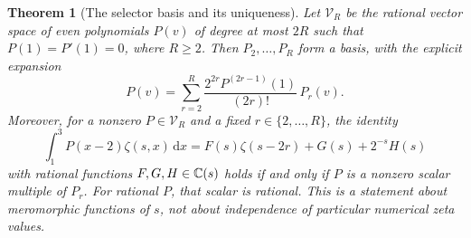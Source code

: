 \documentclass[11pt,letterpaper]{article}
\numberwithin{equation}{section}
\newtheorem{theorem}{Theorem}[section]
\theoremstyle{definition}\newtheorem{definition}[theorem]{Definition}
\theoremstyle{remark}\newtheorem{remark}[theorem]{Remark}
\newcommand{\dd}{\,\mathrm d}\newcommand{\ii}{\mathrm i}
\begin{document}
\begin{theorem}[The selector basis and its uniqueness]
\label{ag:thm:selector-classification}
Let $\mathscr V_R$ be the rational vector space of even polynomials
$P(v)$ of degree at most $2R$ such that $P(1)=P'(1)=0$, where $R\ge2$.
Then $P_2,\ldots,P_R$ form a basis, with the explicit expansion
\begin{equation}\label{ag:eq:selector-expansion}
 \boxed{
 P(v)=\sum_{r=2}^R\frac{2^{2r}P^{(2r-1)}(1)}{(2r)!}\,P_r(v).}
\end{equation}
Moreover, for a nonzero $P\in\mathscr V_R$ and a fixed $r\in\{2,\ldots,R\}$,
the identity
\begin{equation}\label{ag:eq:selector-class}
 \int_1^3P(x-2)\zeta(s,x)\dd x
 =F(s)\zeta(s-2r)+G(s)+2^{-s}H(s)
\end{equation}
with rational functions $F,G,H\in\mathbb C(s)$ holds if and only if $P$ is a
nonzero scalar multiple of $P_r$. For rational $P$, that scalar is
rational. This is a statement about meromorphic functions of $s$, not
about independence of particular numerical zeta values.
\end{theorem}
\end{document}

